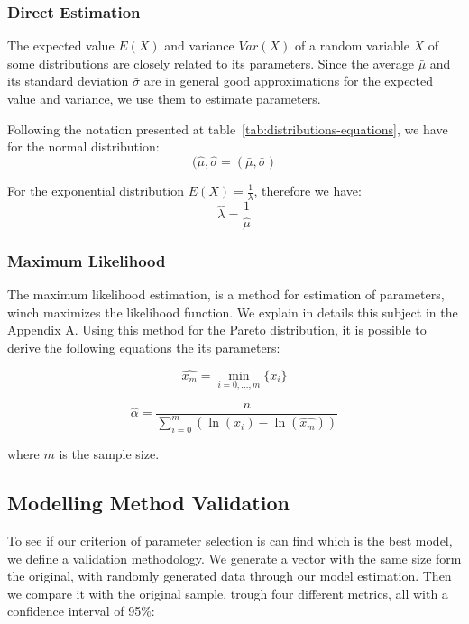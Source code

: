 \subsubsection{Direct Estimation}

The expected value $E(X)$ and variance $Var(X)$ of a random variable $X$ of some distributions are closely related to its parameters. Since the average $\bar{\mu}$ and its standard deviation $\bar{\sigma}$ are in general good approximations for the expected value and variance, we use them to estimate parameters.

Following the notation presented at table~\ref{tab:distributions-equations}, we have for the normal distribution:
\begin{equation}
(\hat{\mu}, \hat{\sigma} = (\bar{\mu}, \bar{\sigma})
\end{equation}

For the exponential distribution $E(X) = \frac{1}{\lambda}$, therefore we have:
\begin{equation}
\hat{\lambda} = \frac{1}{\hat{\mu}}
\end{equation} 

\subsubsection{Maximum Likelihood}


The maximum likelihood estimation, is a method for estimation of parameters, winch maximizes the likelihood function. We explain in details this subject in the Appendix A. Using this method for the Pareto distribution, it is possible to derive the following equations the its parameters:

\begin{equation}
\hat{x_{m}} = \min_{i = 0, ..., m}\{x_{i}\}
\end{equation} 

\begin{equation}
\hat{\alpha} = \frac{n}{ \sum_{i = 0}^{m}(\ln{(x_{i}) - \ln(\hat{x_{m}})})  }
\end{equation} 

where $m$ is the sample size.


\subsection{Modelling Method Validation}

To see if our criterion of parameter selection is can find which is the best model, we define a validation methodology. 
We generate a vector with the same size form the original, with randomly generated data through our model estimation. Then we compare it with the original sample, trough four different metrics, all with a confidence interval of 95\%:

